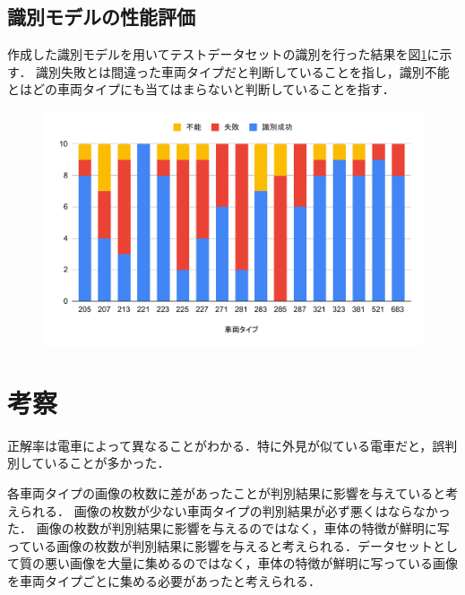 \begin{multicols*}{2}
\subsection{識別モデルの性能評価}
作成した識別モデルを用いてテストデータセットの識別を行った結果を図\ref{fig:chartdet}に示す．
識別失敗とは間違った車両タイプだと判断していることを指し，識別不能とはどの車両タイプにも当てはまらないと判断していることを指す．
\begin{figure}
	\centering
	\includegraphics[width=\linewidth]{obj/chartDET.pdf}
	\label{fig:chartdet}
\end{figure}





\section{考察}
正解率は電車によって異なることがわかる．特に外見が似ている電車だと，誤判別していることが多かった．%

各車両タイプの画像の枚数に差があったことが判別結果に影響を与えていると考えられる．
画像の枚数が少ない車両タイプの判別結果が必ず悪くはならなかった．
画像の枚数が判別結果に影響を与えるのではなく，車体の特徴が鮮明に写っている画像の枚数が判別結果に影響を与えると考えられる．データセットとして質の悪い画像を大量に集めるのではなく，車体の特徴が鮮明に写っている画像を車両タイプごとに集める必要があったと考えられる．\\



\end{multicols*}
